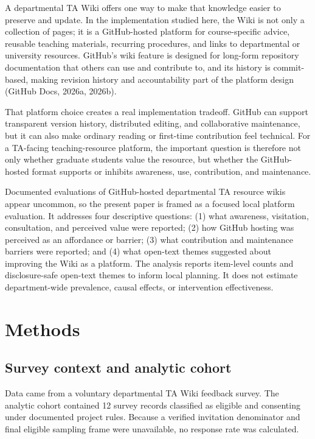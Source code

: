 \documentclass[11pt]{article}
\begin{document}
A departmental TA Wiki offers one way to make that knowledge easier to preserve and update. In the implementation studied here, the Wiki is not only a collection of pages; it is a GitHub-hosted platform for course-specific advice, reusable teaching materials, recurring procedures, and links to departmental or university resources. GitHub's wiki feature is designed for long-form repository documentation that others can use and contribute to, and its history is commit-based, making revision history and accountability part of the platform design (GitHub Docs, 2026a, 2026b).

That platform choice creates a real implementation tradeoff. GitHub can support transparent version history, distributed editing, and collaborative maintenance, but it can also make ordinary reading or first-time contribution feel technical. For a TA-facing teaching-resource platform, the important question is therefore not only whether graduate students value the resource, but whether the GitHub-hosted format supports or inhibits awareness, use, contribution, and maintenance.

Documented evaluations of GitHub-hosted departmental TA resource wikis appear uncommon, so the present paper is framed as a focused local platform evaluation. It addresses four descriptive questions: (1) what awareness, visitation, consultation, and perceived value were reported; (2) how GitHub hosting was perceived as an affordance or barrier; (3) what contribution and maintenance barriers were reported; and (4) what open-text themes suggested about improving the Wiki as a platform. The analysis reports item-level counts and disclosure-safe open-text themes to inform local planning. It does not estimate department-wide prevalence, causal effects, or intervention effectiveness.

\section{Methods}
\subsection{Survey context and analytic cohort}
Data came from a voluntary departmental TA Wiki feedback survey. The analytic cohort contained 12 survey records classified as eligible and consenting under documented project rules. Because a verified invitation denominator and final eligible sampling frame were unavailable, no response rate was calculated.
\end{document}
